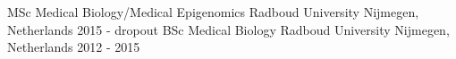 

\begin{cventries}

\cventry
  { MSc Medical Biology/Medical Epigenomics } %
  { Radboud University } %
  { Nijmegen, Netherlands } %
  { 2015 - dropout } %
  {}
\cventry
  { BSc Medical Biology } %
  { Radboud University } %
  { Nijmegen, Netherlands } %
  { 2012 - 2015 } %
  {}

\end{cventries}